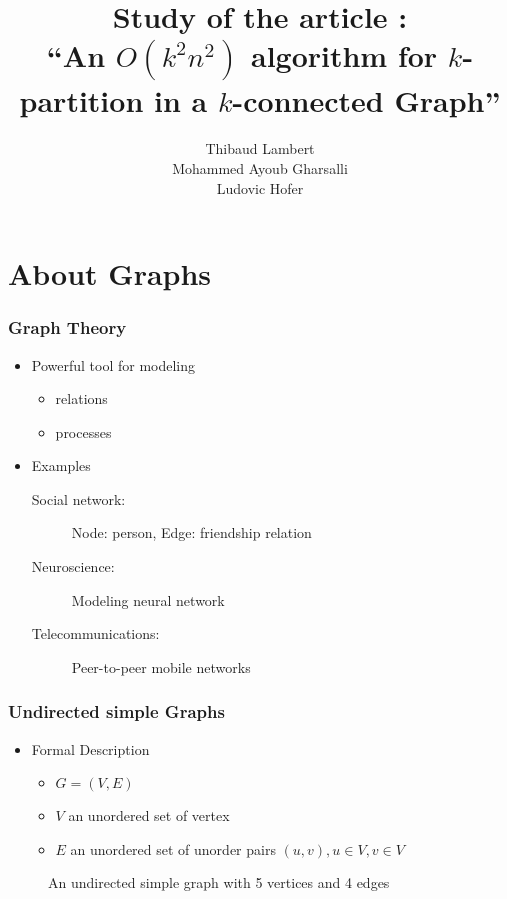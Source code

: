 \documentclass[xcolor=dvipsnames]{beamer}
\title[$O(k^2n^2)$ algorithm for $k$-partitioning]{Study of the article :\\``An $O(k^2n^2)$ algorithm for $k$-partition in a $k$-connected Graph''}
\author[Lambert, Gharsalli, Hofer]
       {Thibaud Lambert\\Mohammed Ayoub Gharsalli\\Ludovic Hofer}
\institute{University of Bordeaux I}
\begin{document}
\begin{frame}[plain]
  \maketitle
\end{frame}

\begin{frame}[plain]
  \tableofcontents
\end{frame}

\section{About Graphs}

\begin{frame}
  \frametitle{Graph Theory}
  \begin{itemize}
  \item Powerful tool for modeling
    \begin{itemize}
    \item relations
    \item processes
    \end{itemize}
  \item Examples
    \begin{description}
     \item [Social network:] Node: person, Edge: friendship relation
     \item [Neuroscience:] Modeling neural network  \cite{BuSp09}
     \item [Telecommunications:] Peer-to-peer mobile networks  \cite{FaCh99}
    \end{description}
  \end{itemize}
\end{frame}

\begin{frame}
  \frametitle{Undirected simple Graphs}
  \begin{itemize}
    \item Formal Description
      \begin{itemize}
      \item $G = (V,E)$
      \item $V$ an unordered set of vertex
      \item $E$ an unordered set of unorder pairs $(u,v), u \in V, v \in V$
      \end{itemize}
  \end{itemize}
  \begin{figure}
    \begin{center}
    
    \end{center}
    \caption{An undirected simple graph with 5 vertices and 4 edges}
  \end{figure}
\end{frame}
\end{document}
